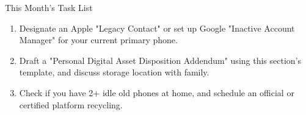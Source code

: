 \begin{tcbpractice}{This Month's Task List}
\begin{enumerate}
  \item Designate an Apple "Legacy Contact" or set up Google "Inactive Account Manager" for your current primary phone.
  \item Draft a "Personal Digital Asset Disposition Addendum" using this section's template, and discuss storage location with family.
  \item Check if you have 2+ idle old phones at home, and schedule an official or certified platform recycling.
\end{enumerate}

\end{tcbpractice}
